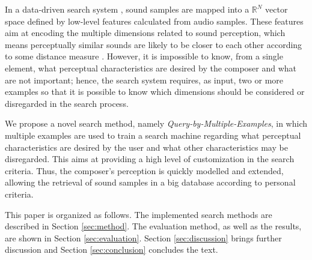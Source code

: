 \documentclass{article}
\begin{document}
In a data-driven search system \cite{Li2000,Lancieri2008}, sound samples are
mapped into a $\mathbb{R}^N$ vector space defined by low-level
features calculated 
from audio samples. These features aim at encoding the multiple
dimensions related to sound perception, which means perceptually similar sounds are
likely to be closer to each other \cite{Tzanetakis2002} according to
some distance measure \cite{Helen2010}. 
However, it is
impossible to know, from a single element, what perceptual
characteristics are desired by the composer and what are not
important; hence, the search system 
requires, as input, two or more examples so that it is possible to
know which dimensions should be considered or disregarded in the
search process.

We propose a novel search method, namely
\textit{Query-by-Multiple-Examples}, 
in which multiple examples are used to train a search machine
regarding what perceptual characteristics are desired 
by the user and what other characteristics may be disregarded. This
aims at providing a high level of customization in the search
criteria. Thus, the composer's perception is quickly modelled and
extended, allowing the retrieval of sound samples in a big database
according to personal criteria.

This paper is organized as follows.
The implemented search methods
are described in Section \ref{sec:method}. The evaluation method, as
well as the results, are shown in Section
\ref{sec:evaluation}. Section \ref{sec:discussion} brings further
discussion and Section \ref{sec:conclusion} concludes the text.


\end{document}
